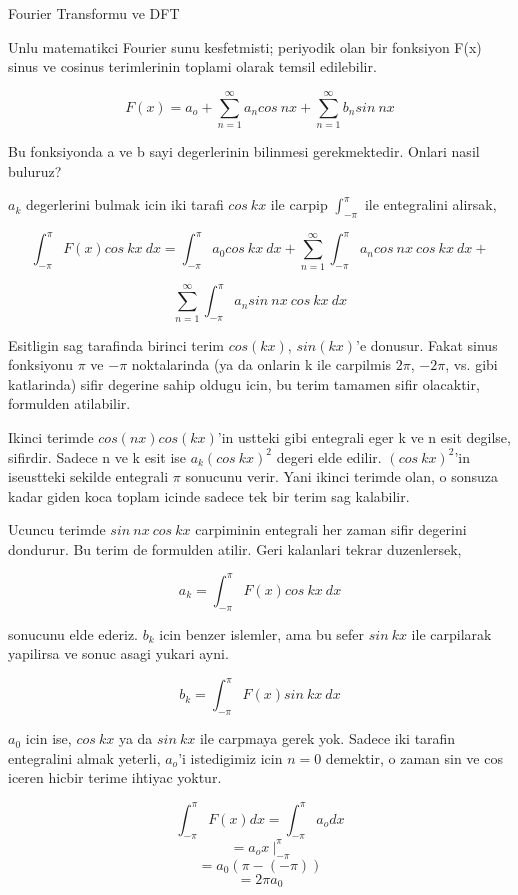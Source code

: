 \documentclass[12pt,fleqn]{article}\usepackage{../common}
\begin{document}
Fourier Transformu ve DFT

Unlu matematikci Fourier sunu kesfetmisti; periyodik olan bir fonksiyon F(x)
sinus ve cosinus terimlerinin toplami olarak temsil edilebilir.

\[ F(x) = a_o + \sum_{n=1}^{\infty}a_ncos \ nx + \sum_{n=1}^{\infty}b_nsin \ nx  \]

Bu fonksiyonda a ve b sayi degerlerinin bilinmesi gerekmektedir. Onlari nasil
buluruz? 

$a_k$ degerlerini bulmak icin iki tarafi $cos \ kx$ ile carpip
$\int_{-\pi}^{\pi}$ ile entegralini alirsak,

\[ \int_{-\pi}^{\pi} F(x)cos \ kx \ dx = \int_{-\pi}^{\pi} a_0 cos \
kx \ dx +  \sum_{n=1}^{\infty}\int_{-\pi}^{\pi} a_ncos \ nx \ cos \ kx \ dx +   \]

\[ \sum_{n=1}^{\infty}\int_{-\pi}^{\pi} a_nsin \ nx \ cos \ kx \ dx   \]

Esitligin sag tarafinda birinci terim $cos(kx)$, $sin(kx)$'e donusur. Fakat sinus
fonksiyonu $\pi$ ve $-\pi$ noktalarinda (ya da onlarin k ile carpilmis $2\pi$,
$-2\pi$, vs. gibi katlarinda) sifir degerine sahip oldugu icin, bu terim tamamen
sifir olacaktir, formulden atilabilir.

Ikinci terimde $cos(nx)cos(kx)$'in ustteki gibi entegrali eger k ve n esit
degilse, sifirdir. Sadece n ve k esit ise $a_k(cos \ kx)^2$ degeri elde edilir.
$(cos \ kx)^2$'in iseustteki sekilde entegrali $\pi$ sonucunu verir. Yani ikinci
terimde olan, o sonsuza kadar giden koca toplam icinde sadece tek bir terim sag
kalabilir.

Ucuncu terimde $sin \ nx \ cos \ kx$ carpiminin entegrali her zaman
sifir degerini dondurur. Bu terim de formulden atilir. Geri kalanlari tekrar
duzenlersek, 

\[ a_k = \int_{-\pi}^{\pi} F(x)cos \ kx \ dx \]

sonucunu elde ederiz. $b_k$ icin benzer islemler, ama bu sefer $sin \ kx$ ile carpilarak yapilirsa ve
sonuc asagi yukari ayni.

\[ b_k = \int_{-\pi}^{\pi} F(x)sin \ kx \ dx \]

$a_0$ icin ise, $cos \ kx$ ya da $sin \ kx$ ile carpmaya gerek yok. Sadece iki
tarafin entegralini almak yeterli, $a_o$'i istedigimiz icin $n=0$ demektir, o
zaman sin ve cos iceren hicbir terime ihtiyac yoktur.

\[  \int_{-\pi}^{\pi} F(x) dx =  \int_{-\pi}^{\pi} a_o dx \]
\[  =  a_o x \ \bigg|_{-\pi}^{\pi}  \]
\[  = a_0 (\pi -(-\pi))  \]
\[  = 2\pi a_0  \]
\end{document}
